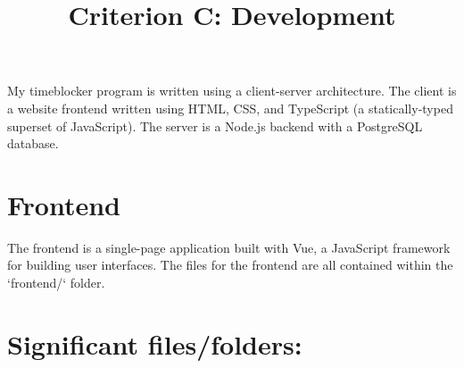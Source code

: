 \documentclass[notitlepage, 12pt]{report}
\title{Criterion C: Development}
\begin{document}
\centerline{\textcolor{msblue}{
		\textbf{\fontsize{13}{13}\MyTitle}
	}}
\bigskip

My timeblocker program is written using a client-server architecture. The client is a website frontend written using HTML, CSS, and TypeScript (a statically-typed superset of JavaScript). The server is a Node.js backend with a PostgreSQL database.

\section*{Frontend}
The frontend is a single-page application built with Vue, a JavaScript framework for building user interfaces. The files for the frontend are all contained within the `frontend/` folder.

\section*{Significant files/folders:}
\end{document}
